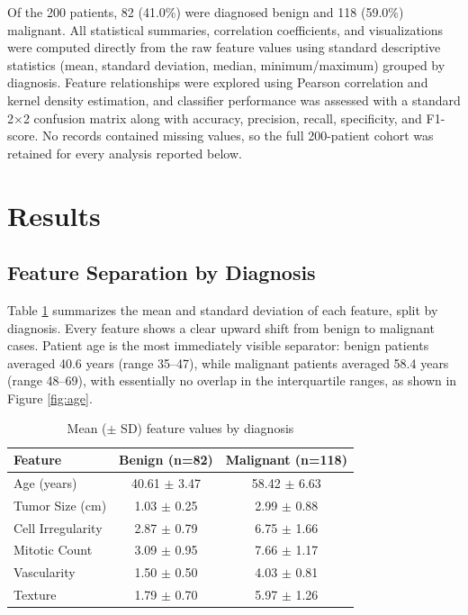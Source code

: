\documentclass[10pt,twocolumn]{article}
\begin{document}
Of the 200 patients, 82 (41.0\%) were diagnosed benign and 118 (59.0\%) malignant. All statistical summaries, correlation coefficients, and visualizations were computed directly from the raw feature values using standard descriptive statistics (mean, standard deviation, median, minimum/maximum) grouped by diagnosis. Feature relationships were explored using Pearson correlation and kernel density estimation, and classifier performance was assessed with a standard 2$\times$2 confusion matrix along with accuracy, precision, recall, specificity, and F1-score. No records contained missing values, so the full 200-patient cohort was retained for every analysis reported below.

\section{Results}

\subsection{Feature Separation by Diagnosis}
Table \ref{tab:summary} summarizes the mean and standard deviation of each feature, split by diagnosis. Every feature shows a clear upward shift from benign to malignant cases. Patient age is the most immediately visible separator: benign patients averaged 40.6 years (range 35--47), while malignant patients averaged 58.4 years (range 48--69), with essentially no overlap in the interquartile ranges, as shown in Figure \ref{fig:age}.

\begin{table}[t]
\centering
\caption{Mean ($\pm$ SD) feature values by diagnosis}
\label{tab:summary}
\small
\begin{tabular}{lcc}
\toprule
\textbf{Feature} & \textbf{Benign (n=82)} & \textbf{Malignant (n=118)} \\
\midrule
Age (years)        & 40.61 $\pm$ 3.47 & 58.42 $\pm$ 6.63 \\
Tumor Size (cm)     & 1.03 $\pm$ 0.25  & 2.99 $\pm$ 0.88 \\
Cell Irregularity   & 2.87 $\pm$ 0.79  & 6.75 $\pm$ 1.66 \\
Mitotic Count       & 3.09 $\pm$ 0.95  & 7.66 $\pm$ 1.17 \\
Vascularity         & 1.50 $\pm$ 0.50  & 4.03 $\pm$ 0.81 \\
Texture             & 1.79 $\pm$ 0.70  & 5.97 $\pm$ 1.26 \\
\bottomrule
\end{tabular}
\end{table}
\end{document}
